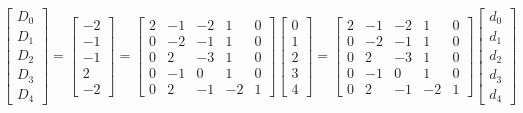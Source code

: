 \documentclass{article}%
\begin{document}
\[%
\left[\begin{matrix}D_{0}\\D_{1}\\D_{2}\\D_{3}\\D_{4}\end{matrix}\right] = \left[\begin{matrix}-2\\-1\\-1\\2\\-2\end{matrix}\right] = \left[\begin{matrix}2 & -1 & -2 & 1 & 0\\0 & -2 & -1 & 1 & 0\\0 & 2 & -3 & 1 & 0\\0 & -1 & 0 & 1 & 0\\0 & 2 & -1 & -2 & 1\end{matrix}\right] \left[\begin{matrix}0\\1\\2\\3\\4\end{matrix}\right] = \left[\begin{matrix}2 & -1 & -2 & 1 & 0\\0 & -2 & -1 & 1 & 0\\0 & 2 & -3 & 1 & 0\\0 & -1 & 0 & 1 & 0\\0 & 2 & -1 & -2 & 1\end{matrix}\right] \left[\begin{matrix}d_{0}\\d_{1}\\d_{2}\\d_{3}\\d_{4}\end{matrix}\right]%
\]%
\end{document}
